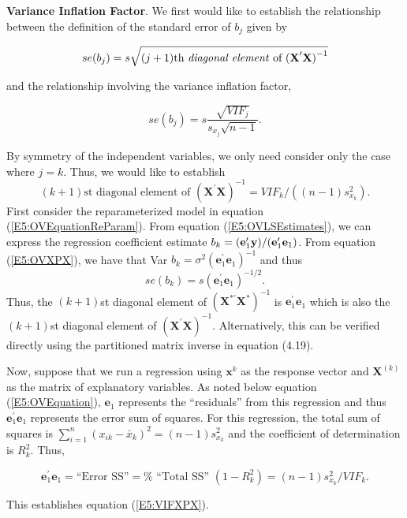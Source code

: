 \textbf{Variance Inflation Factor}. We first would like to establish
the relationship between the definition of the standard error of
$b_j$ given by
\begin{center}
\[
se(b_j)=s\sqrt{(j+1)\text{th \textit{diagonal element} of }\mathbf{(X}%
^{\prime}\mathbf{X)}^{-1}}
\]
\end{center}
and the relationship involving the variance inflation factor,
\begin{center}
\[
se(b_j)=s\frac{\sqrt{VIF_j}}{s_{x_j}\sqrt{n-1}}.
\]
\end{center}
By symmetry of the independent variables, we only need consider only
the case where $j=k$. Thus, we would like to establish
\begin{equation}\label{E5:VIFXPX}
(k+1)\text{st diagonal element of }(\mathbf{X}^{\prime}\mathbf{X}%
)^{-1}=VIF_{k}/((n-1)s_{x_{k}}^2).
\end{equation}
First consider the reparameterized model in equation
(\ref{E5:OVEquationReParam}). From equation
(\ref{E5:OVLSEstimates}), we can express the regression coefficient estimate $b_{k}=(\mathbf{%
e}_1^{\prime}\mathbf{y})/(\mathbf{e}_1^{\prime}\mathbf{%
e}_1)$. From equation (\ref{E5:OVXPX}), we have that Var $b_{k}=\sigma ^2(%
\mathbf{e}_1^{\prime}\mathbf{e}_1)^{-1}$ and thus
\begin{equation}\label{E5:StdErrorReparam}
se(b_{k})=s(\mathbf{e}_1^{\prime}\mathbf{e}_1)^{-1/2}.
\end{equation}
Thus, the $(k+1)$st diagonal element of $(\mathbf{X}^{\ast \prime }\mathbf{X}%
^{\ast })^{-1}$ is $\mathbf{e}_1^{\prime}\mathbf{e}_1$
which is also the $(k+1)$st diagonal element of $(\mathbf{X}^{\prime}%
\mathbf{X})^{-1}$. Alternatively, this can be verified directly
using the partitioned matrix inverse in equation (4.19).

Now, suppose that we run a regression using $\mathbf{x}^{k}$ as the
response vector and $\mathbf{X}^{(k)}$ as the matrix of explanatory
variables. As noted below equation (\ref{E5:OVEquation}),
$\mathbf{e}_1$
represents the ``residuals'' from this regression and thus $\mathbf{e}%
_1^{\prime}\mathbf{e}_1$ represents the error sum of squares. For
this regression, the total sum of squares is $\sum_{i=1}^{n}(x_{ik}-\bar{x}%
_{k})^2=(n-1)s_{x_{k}}^2$ and the coefficient of determination is $%
R_{k}^2$. Thus,
\begin{center}
\[
\mathbf{e}_1^{\prime}\mathbf{e}_1=\text{``Error SS''}=\text{%
``Total SS'' }(1-R_{k}^2)=(n-1)s_{x_{k}}^2/VIF_{k}.
\]
\end{center}
This establishes equation (\ref{E5:VIFXPX}).


